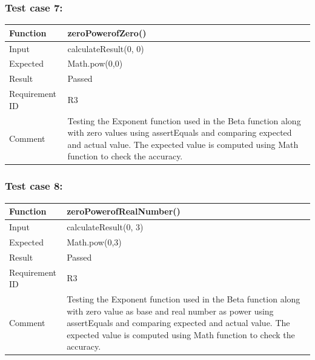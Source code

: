 \documentclass[letterpaper, 11pt]{article}
\begin{document}
        \subsubsection{\textbf{Test case 7:}} 
            \setlength{\tabcolsep}{25pt}
            \renewcommand{\arraystretch}{1.5}
            \begin{tabularx}{1.0\textwidth} { 
                  | >{\raggedright\arraybackslash}X 
                  | >{\raggedright\arraybackslash}X | }
                 \hline
                 Function & zeroPowerofZero()\\
                 \hline
                 Input  & calculateResult(0, 0)\\
                  \hline
                 Expected  & Math.pow(0,0)\\
                  \hline
                 Result  & Passed\\
                  \hline
                 Requirement ID  & R3\\
                    \hline
                 Comment  & Testing the Exponent function used in the Beta function along with zero values using assertEquals and comparing expected and actual value. The expected value is computed using Math function to check the accuracy.\\
                \hline
            \end{tabularx} 

        \subsubsection{\textbf{Test case 8:}} 
            \setlength{\tabcolsep}{25pt}
            \renewcommand{\arraystretch}{1.5}
            \begin{tabularx}{1.0\textwidth} { 
                  | >{\raggedright\arraybackslash}X 
                  | >{\raggedright\arraybackslash}X | }
                 \hline
                 Function & zeroPowerofRealNumber()\\
                 \hline
                 Input  & calculateResult(0, 3)\\
                  \hline
                 Expected  & Math.pow(0,3)\\
                  \hline
                 Result  & Passed\\
                  \hline
                 Requirement ID  & R3\\
                    \hline
                 Comment  & Testing the Exponent function used in the Beta function along with zero value as base and real number as power using assertEquals and comparing expected and actual value. The expected value is computed using Math function to check the accuracy.\\
                \hline
            \end{tabularx} 
\end{document}
